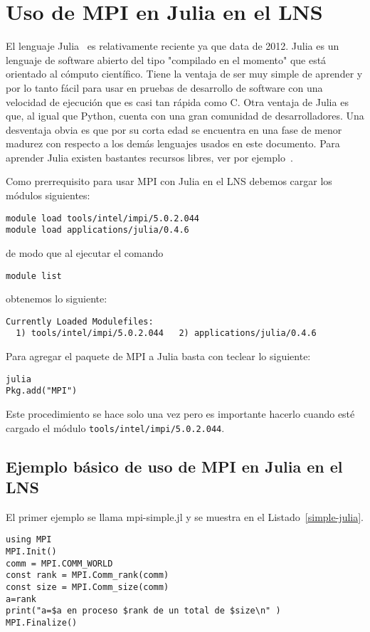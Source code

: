 \documentclass[letter]{jpconf}
\begin{document}


\section{Uso de MPI en Julia en el LNS}

El lenguaje Julia~\cite{julia} es relativamente reciente ya que data de 2012. Julia es un lenguaje de software abierto del tipo "compilado en el momento" que est\'a orientado al c\'omputo cient\'ifico. Tiene la ventaja de ser muy simple de aprender y por lo tanto f\'acil para usar en pruebas de desarrollo de software con una velocidad de ejecuci\'on que es casi tan r\'apida como C. Otra ventaja de Julia es que, al igual que Python, cuenta con una gran comunidad de desarrolladores. Una desventaja obvia es que por su corta edad se encuentra en una fase de menor madurez con respecto a los dem\'as lenguajes usados en este documento. Para aprender Julia existen bastantes recursos libres, ver por ejemplo~\cite{julialearn}.

Como prerrequisito para usar MPI con Julia en el LNS debemos cargar los m\'odulos siguientes:
\color{blue}
\begin{verbatim}
module load tools/intel/impi/5.0.2.044
module load applications/julia/0.4.6
\end{verbatim}
\color{black}
de modo que al ejecutar el comando
\color{blue}
\begin{verbatim}
module list
\end{verbatim}
\color{black}
obtenemos lo siguiente:
\color{brown}
\begin{verbatim}
Currently Loaded Modulefiles:
  1) tools/intel/impi/5.0.2.044   2) applications/julia/0.4.6
\end{verbatim}
\color{black}

Para agregar el paquete de MPI a Julia basta con teclear lo siguiente:
\color{blue}
\begin{verbatim}
julia
Pkg.add("MPI")
\end{verbatim}
\color{black}
Este procedimiento se hace solo una vez pero es importante hacerlo  cuando est\'e cargado el m\'odulo \texttt{tools/intel/impi/5.0.2.044}.


\subsection{Ejemplo b\'asico de uso de MPI en Julia en el LNS}

El primer ejemplo se llama mpi-simple.jl y se muestra en el Listado~\ref{simple-julia}.
\begin{lstlisting}[float,floatplacement=H,label=simple-julia,caption=Listado del programa  \texttt{mpi-simple.jl} en Julia]
using MPI
MPI.Init()
comm = MPI.COMM_WORLD
const rank = MPI.Comm_rank(comm)
const size = MPI.Comm_size(comm)
a=rank
print("a=$a en proceso $rank de un total de $size\n" )
MPI.Finalize()
\end{lstlisting}
\end{document}

